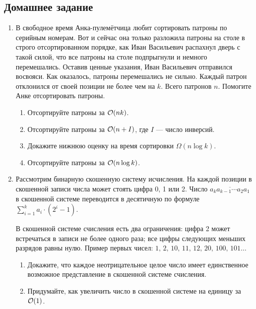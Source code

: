 \subsection{Домашнее задание}
\begin{enumerate}
 \item
  В свободное время Анка-пулемётчица любит сортировать патроны по
  серийным номерам. Вот и сейчас она только разложила патроны на
  столе в строго отсортированном порядке, как Иван Васильевич
  распахнул дверь с такой силой, что все патроны на столе подпрыгнули
  и немного перемешались. Оставив ценные указания, Иван Васильевич
  отправился восвояси.  Как оказалось, патроны перемешались не
  сильно. Каждый патрон отклонился от своей позиции не более чем на
  $k$. Всего патронов $n$. Помогите Анке отсортировать
  патроны.

  \begin{enumerate}
     \item Отсортируйте патроны за $\mathcal{O}(nk)$.
     \item Отсортируйте патроны за $\mathcal{O}(n + I)$, 
      где $I$ --- число инверсий.
     \item Докажите нижнюю оценку на время сортировки $\Omega(n \log k)$.
     \item Отсортируйте патроны за $\mathcal{O}(n \log k)$.
  \end{enumerate}

  \item
    Рассмотрим бинарную скошенную систему исчисления. На каждой
    позиции в скошенной записи числа может стоять цифра 0, 1 или
    2. Число $\overline{a_k a_{k-1} \cdots a_2 a_1}$ в скошенной системе
    переводится в десятичную по формуле $\sum_{i = 1}^k a_i \cdot (2^i - 1)$.

    В скошенной системе счисления есть два ограничения: цифра 2 может
    встречаться в записи не более одного раза; все цифры следующих
    меньших разрядов равны нулю.  Пример первых чисел:
    $1,\,2,\,10,\,11,\,12,\,20,\,100,\,101\dots$

    \begin{enumerate}
      \item Докажите, что каждое неотрицательное целое число имеет
        единственное возможное представление в скошенной системе счисления.
      \item Придумайте, как увеличить число в скошенной системе на
        единицу за $\mathcal{O}(1)$.
    \end{enumerate}


\end{enumerate}
